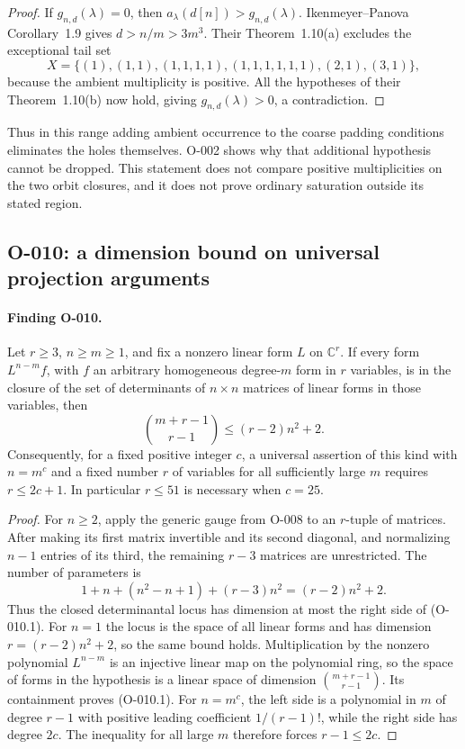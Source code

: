 \begin{proof}
If $g_{n,d}(\lambda)=0$, then $a_\lambda(d[n])>g_{n,d}(\lambda)$.
Ikenmeyer--Panova Corollary~1.9 gives
$d>n/m>3m^3$. Their Theorem~1.10(a) excludes the exceptional tail set
\[
 X=\{(1),(1,1),(1,1,1,1),(1,1,1,1,1,1),(2,1),(3,1)\},
\]
because the ambient multiplicity is positive. All the hypotheses
of their Theorem~1.10(b) now hold, giving $g_{n,d}(\lambda)>0$,
a contradiction.
\end{proof}

Thus in this range adding ambient occurrence to the coarse padding
conditions eliminates the holes themselves. O-002 shows why that
additional hypothesis cannot be dropped. This statement does not
compare positive multiplicities on the two orbit closures, and it
does not prove ordinary saturation outside its stated region.

\subsection{O-010: a dimension bound on universal projection arguments}

\paragraph{Finding O-010.}
Let $r\geq3$, $n\geq m\geq1$, and fix a nonzero linear form $L$
on $\mathbb C^r$. If every form
$L^{n-m}f$, with $f$ an arbitrary homogeneous degree-$m$ form in
$r$ variables, is in the closure of the set of determinants of
$n\times n$ matrices of linear forms in those variables, then
\[
       \binom{m+r-1}{r-1}\leq(r-2)n^2+2.                \tag{O-010.1}
\]
Consequently, for a fixed positive integer $c$, a universal assertion
of this kind with $n=m^c$ and a fixed number $r$ of variables for
all sufficiently large $m$ requires $r\leq2c+1$. In particular
$r\leq51$ is necessary when $c=25$.

\begin{proof}
For $n\geq2$, apply the generic gauge from O-008 to an $r$-tuple
of matrices. After making its first matrix invertible and its
second diagonal, and normalizing $n-1$ entries of its third, the
remaining $r-3$ matrices are unrestricted. The number of parameters is
\[
       1+n+(n^2-n+1)+(r-3)n^2=(r-2)n^2+2.
\]
Thus the closed determinantal locus has dimension at most the
right side of (O-010.1). For $n=1$ the locus is the space of all
linear forms and has dimension $r=(r-2)n^2+2$, so the same bound
holds. Multiplication by the nonzero polynomial $L^{n-m}$ is an
injective linear map on the polynomial ring, so the space of forms
in the hypothesis is a linear space of dimension
$\binom{m+r-1}{r-1}$. Its containment proves (O-010.1).
For $n=m^c$, the left side is a polynomial in $m$ of degree $r-1$
with positive leading coefficient $1/(r-1)!$, while the right side
has degree $2c$. The inequality for all large $m$ therefore forces
$r-1\leq2c$.
\end{proof}

